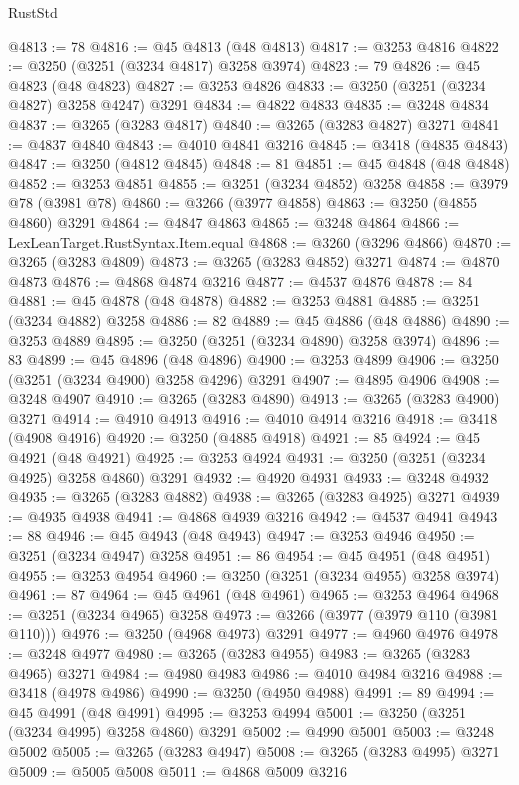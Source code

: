 \begin{lexlean}{RustStd}
\begin{coremodule}
@4813 := 78
@4816 := @45 @4813 (@48 @4813)
@4817 := @3253 @4816
@4822 := @3250 (@3251 (@3234 @4817) @3258 @3974)
@4823 := 79
@4826 := @45 @4823 (@48 @4823)
@4827 := @3253 @4826
@4833 := @3250 (@3251 (@3234 @4827) @3258 @4247) @3291
@4834 := @4822 @4833
@4835 := @3248 @4834
@4837 := @3265 (@3283 @4817)
@4840 := @3265 (@3283 @4827) @3271
@4841 := @4837 @4840
@4843 := @4010 @4841 @3216
@4845 := @3418 (@4835 @4843)
@4847 := @3250 (@4812 @4845)
@4848 := 81
@4851 := @45 @4848 (@48 @4848)
@4852 := @3253 @4851
@4855 := @3251 (@3234 @4852) @3258
@4858 := @3979 @78 (@3981 @78)
@4860 := @3266 (@3977 @4858)
@4863 := @3250 (@4855 @4860) @3291
@4864 := @4847 @4863
@4865 := @3248 @4864
@4866 := LexLeanTarget.RustSyntax.Item.equal
@4868 := @3260 (@3296 @4866)
@4870 := @3265 (@3283 @4809)
@4873 := @3265 (@3283 @4852) @3271
@4874 := @4870 @4873
@4876 := @4868 @4874 @3216
@4877 := @4537 @4876
@4878 := 84
@4881 := @45 @4878 (@48 @4878)
@4882 := @3253 @4881
@4885 := @3251 (@3234 @4882) @3258
@4886 := 82
@4889 := @45 @4886 (@48 @4886)
@4890 := @3253 @4889
@4895 := @3250 (@3251 (@3234 @4890) @3258 @3974)
@4896 := 83
@4899 := @45 @4896 (@48 @4896)
@4900 := @3253 @4899
@4906 := @3250 (@3251 (@3234 @4900) @3258 @4296) @3291
@4907 := @4895 @4906
@4908 := @3248 @4907
@4910 := @3265 (@3283 @4890)
@4913 := @3265 (@3283 @4900) @3271
@4914 := @4910 @4913
@4916 := @4010 @4914 @3216
@4918 := @3418 (@4908 @4916)
@4920 := @3250 (@4885 @4918)
@4921 := 85
@4924 := @45 @4921 (@48 @4921)
@4925 := @3253 @4924
@4931 := @3250 (@3251 (@3234 @4925) @3258 @4860) @3291
@4932 := @4920 @4931
@4933 := @3248 @4932
@4935 := @3265 (@3283 @4882)
@4938 := @3265 (@3283 @4925) @3271
@4939 := @4935 @4938
@4941 := @4868 @4939 @3216
@4942 := @4537 @4941
@4943 := 88
@4946 := @45 @4943 (@48 @4943)
@4947 := @3253 @4946
@4950 := @3251 (@3234 @4947) @3258
@4951 := 86
@4954 := @45 @4951 (@48 @4951)
@4955 := @3253 @4954
@4960 := @3250 (@3251 (@3234 @4955) @3258 @3974)
@4961 := 87
@4964 := @45 @4961 (@48 @4961)
@4965 := @3253 @4964
@4968 := @3251 (@3234 @4965) @3258
@4973 := @3266 (@3977 (@3979 @110 (@3981 @110)))
@4976 := @3250 (@4968 @4973) @3291
@4977 := @4960 @4976
@4978 := @3248 @4977
@4980 := @3265 (@3283 @4955)
@4983 := @3265 (@3283 @4965) @3271
@4984 := @4980 @4983
@4986 := @4010 @4984 @3216
@4988 := @3418 (@4978 @4986)
@4990 := @3250 (@4950 @4988)
@4991 := 89
@4994 := @45 @4991 (@48 @4991)
@4995 := @3253 @4994
@5001 := @3250 (@3251 (@3234 @4995) @3258 @4860) @3291
@5002 := @4990 @5001
@5003 := @3248 @5002
@5005 := @3265 (@3283 @4947)
@5008 := @3265 (@3283 @4995) @3271
@5009 := @5005 @5008
@5011 := @4868 @5009 @3216

\end{coremodule}
\end{lexlean}
